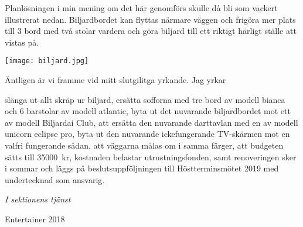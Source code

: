 \documentclass[../_main/handlingar.tex]{subfiles}
\begin{document}
Planlösningen i min mening om det här genomförs skulle då bli som vackert illustrerat
nedan. Biljardbordet kan flyttas närmare väggen och frigöra mer plats till 3 bord med två
stolar vardera och göra biljard till ett riktigt härligt ställe att vistas på.


\begin{center}
    \texttt{[image: biljard.jpg]}
\end{center}

\newpage

Äntligen är vi framme vid mitt slutgilitga yrkande. Jag yrkar

    \begin{attsatser}
       \att slänga ut allt skräp ur biljard,
       \att ersätta sofforna med tre bord av modell bianca och 6 barstolar av modell atlantic,
       \att byta ut det nuvarande biljardbordet mot ett av modell Biljardai Club,
       \att att ersätta den nuvarande darttavlan med en av modell unicorn eclipse pro,
        \att byta ut den nuvarande ickefungerande TV-skärmen mot en valfri fungerande sådan,
        \att att väggarna målas om i samma färger,
        \att att budgeten sätts till \SI{35000}{kr},
        \att kostnaden belastar utrustningsfonden, samt
        \att renoveringen sker i sommar och läggs på beslutsuppföljningen till Höstterminsmötet 2019 med undertecknad som ansvarig.
    \end{attsatser}
    


\begin{signatures}{1}
        \textit{I sektionens tjänst}
        \signature{Adam Belfrage}{Entertainer 2018}
    \end{signatures}
\end{document}

